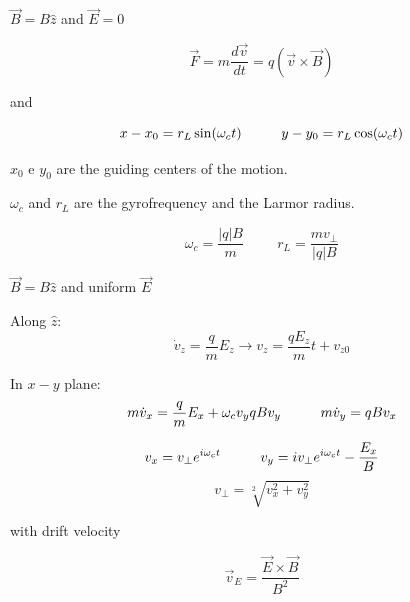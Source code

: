 \documentclass[10pt]{beamer}
\begin{document}
\begin{frame}{$\vec{B} = B\hat{z}$ and $\vec{E} = 0$}
 
\begin{equation}
\vec{F} = m \frac{d \vec{v}}{dt} = q(\vec{v}\times \vec{B})
\label{Lorentz}
\end{equation}

and

\begin{equation}
x-x_0 = r_L \sin(\omega_c t) \hspace{1 cm} y-y_0 = r_L \cos(\omega_c t)
\end{equation}

$x_0$ e $y_0$ are the guiding centers of the motion.

$\omega_c$ and $r_L$ are the gyrofrequency and the Larmor radius.

\begin{equation}
\omega_c = \frac{|q|B}{m}      \hspace{1cm}  r_L = \frac{m v_{\perp}}{|q|B}
\end{equation}

\end{frame}


\begin{frame}{$\vec{B} = B\hat{z}$ and uniform $\vec{E}$} 

Along $\hat{z}$:
\begin{equation}
    \dot{v}_z = \frac{q}{m}E_z \rightarrow v_z = \frac{qE_z}{m}t + v_{z0}
\end{equation}

In $x-y$ plane:
\begin{equation}
m\dot{v}_x = \frac{q}{m}E_x + \omega_c v_y  qBv_y \hspace{1 cm} m\dot{v}_y = qBv_x 
\end{equation}

\begin{equation}
v_x = v_{\perp} e^{i\omega_c t} \hspace{1 cm} v_y = iv_{\perp} e^{i\omega_c t} - \frac{E_x}{B}
\end{equation}
\begin{equation}
    v_\perp = \sqrt[2]{v_x^2 + v_y^2}
\end{equation}

with drift velocity

\begin{equation}
\vec{v}_E = \frac{\vec{E}\times \vec{B}}{B^2}
\end{equation}

\end{frame}
\end{document}
